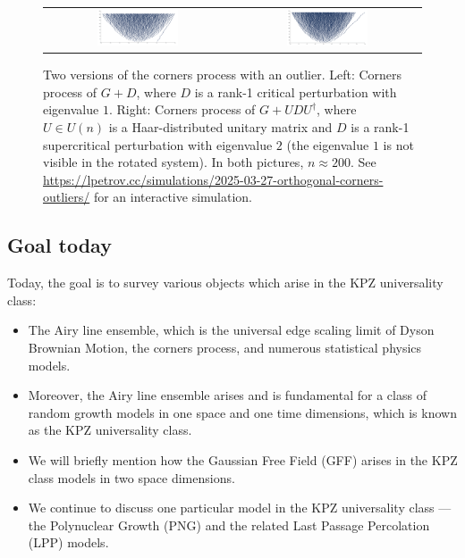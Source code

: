 \documentclass[letterpaper,11pt,oneside,reqno]{book}
\numberwithin{equation}{chapter}  %
\theoremstyle{definition}
\begin{document}
\begin{figure}[]
	\centering
	\begin{tabular}{cc}
		\includegraphics[width=0.45\textwidth]{pictures/outlier.png} &
		\includegraphics[width=0.45\textwidth]{pictures/rotated_outlier.png}
	\end{tabular}
	\caption{Two versions of the corners process with an outlier.
	Left: Corners process of $G+D$, where $D$ is a rank-1 critical perturbation with eigenvalue
	$1$. Right: Corners process of $G+UDU^\dagger$, where
	$U\in U(n)$ is a Haar-distributed unitary matrix and $D$
	is a rank-1 supercritical perturbation with eigenvalue $2$
	(the eigenvalue $1$ is not visible in the rotated system).
	In both pictures, $n\approx 200$. See
	\url{https://lpetrov.cc/simulations/2025-03-27-orthogonal-corners-outliers/}
	for an interactive simulation.}
	\label{lecture12:fig:outlier-evolution}
\end{figure}


\subsection{Goal today}

Today, the goal is to survey various objects which arise in the KPZ universality class:
\begin{itemize}
	\item
		The Airy line ensemble, which is
		the universal edge scaling limit of Dyson Brownian Motion,
		the corners process, and numerous statistical physics models.

	\item
		Moreover, the Airy line ensemble arises and
		is fundamental for a class of random growth models
		in one space and one time dimensions, which is known as the KPZ universality class.

	\item
		We will briefly mention how the Gaussian Free Field (GFF) arises in the KPZ class
		models in two space dimensions.

	\item
		We continue to discuss one particular model in the KPZ universality
		class --- the Polynuclear Growth (PNG) and the related Last Passage Percolation (LPP) models.
\end{itemize}
\end{document}
